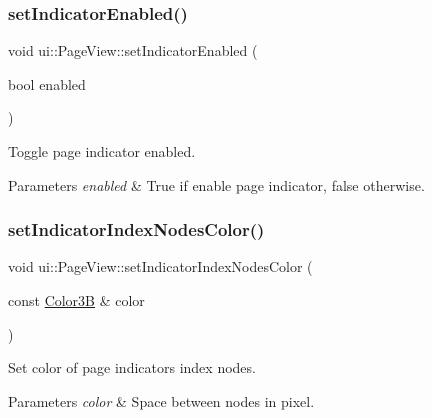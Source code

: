 \subsubsection{\texorpdfstring{set\+Indicator\+Enabled()}{setIndicatorEnabled()}\hspace{0.1cm}{\footnotesize\ttfamily [2/2]}}
{\footnotesize\ttfamily void ui\+::\+Page\+View\+::set\+Indicator\+Enabled (\begin{DoxyParamCaption}\item[{bool}]{enabled }\end{DoxyParamCaption})}



Toggle page indicator enabled. 


\begin{DoxyParams}{Parameters}
{\em enabled} & True if enable page indicator, false otherwise. \\
\hline
\end{DoxyParams}
\mbox{\label{classui_1_1PageView_a6fa17a26a9819a05d61e4b77dbc62ff7}} 
\subsubsection{\texorpdfstring{set\+Indicator\+Index\+Nodes\+Color()}{setIndicatorIndexNodesColor()}\hspace{0.1cm}{\footnotesize\ttfamily [1/2]}}
{\footnotesize\ttfamily void ui\+::\+Page\+View\+::set\+Indicator\+Index\+Nodes\+Color (\begin{DoxyParamCaption}\item[{const \hyperlink{structColor3B}{Color3B} \&}]{color }\end{DoxyParamCaption})}



Set color of page indicator\textquotesingle{}s index nodes. 


\begin{DoxyParams}{Parameters}
{\em color} & Space between nodes in pixel. \\
\hline
\end{DoxyParams}
\mbox{\label{classui_1_1PageView_a6fa17a26a9819a05d61e4b77dbc62ff7}} 
